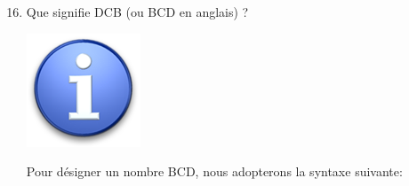 \documentclass{article}
\begin{document}
\begin{enumerate}
	\setcounter{enumi}{15}
	\item Que signifie DCB (ou BCD en anglais) ?\\
\vspace{1em}
\begin{Form}
	\TextField[name=r16,width=\linewidth,height=2.5em,multiline=true]{}
\end{Form}

\begin{minipage}[b]{.08\linewidth}
	\includegraphics[width=\linewidth]{./figures/info.png}
\end{minipage}
\hfill
\begin{minipage}[b]{.85\linewidth}
	Pour désigner un nombre BCD, nous adopterons la syntaxe suivante:\\


\end{minipage}
\end{enumerate}
\end{document}
